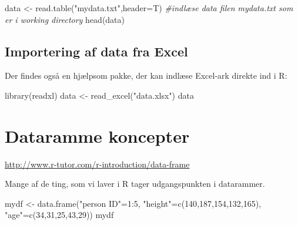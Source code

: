 \documentclass[
]{book}
\newenvironment{Shaded}{\begin{snugshade}}{\end{snugshade}}
\newcommand{\AttributeTok}[1]{\textcolor[rgb]{0.77,0.63,0.00}{#1}}
\newcommand{\CommentTok}[1]{\textcolor[rgb]{0.56,0.35,0.01}{\textit{#1}}}
\newcommand{\DecValTok}[1]{\textcolor[rgb]{0.00,0.00,0.81}{#1}}
\newcommand{\FunctionTok}[1]{\textcolor[rgb]{0.00,0.00,0.00}{#1}}
\newcommand{\NormalTok}[1]{#1}
\newcommand{\OtherTok}[1]{\textcolor[rgb]{0.56,0.35,0.01}{#1}}
\newcommand{\SpecialCharTok}[1]{\textcolor[rgb]{0.00,0.00,0.00}{#1}}
\newcommand{\StringTok}[1]{\textcolor[rgb]{0.31,0.60,0.02}{#1}}
\begin{document}
\begin{Shaded}
\begin{Highlighting}[]
\NormalTok{data }\OtherTok{\textless{}{-}} \FunctionTok{read.table}\NormalTok{(}\StringTok{"mydata.txt"}\NormalTok{,}\AttributeTok{header=}\NormalTok{T) }\CommentTok{\#indlæse data filen mydata.txt som er i working directory}
\FunctionTok{head}\NormalTok{(data)}
\end{Highlighting}
\end{Shaded}

\hypertarget{importering-af-data-fra-excel}{%
\subsection{Importering af data fra Excel}\label{importering-af-data-fra-excel}}

Der findes også en hjælpsom pakke, der kan indlæse Excel-ark direkte ind i R:

\begin{Shaded}
\begin{Highlighting}[]
\FunctionTok{library}\NormalTok{(readxl)}
\NormalTok{data }\OtherTok{\textless{}{-}} \FunctionTok{read\_excel}\NormalTok{(}\StringTok{"data.xlsx"}\NormalTok{)}
\NormalTok{data}
\end{Highlighting}
\end{Shaded}

\hypertarget{dataramme-koncepter}{%
\section{Dataramme koncepter}\label{dataramme-koncepter}}

\url{http://www.r-tutor.com/r-introduction/data-frame}

Mange af de ting, som vi laver i R tager udgangspunkten i datarammer.

\begin{Shaded}
\begin{Highlighting}[]
\NormalTok{mydf }\OtherTok{\textless{}{-}} \FunctionTok{data.frame}\NormalTok{(}\StringTok{"person ID"}\OtherTok{=}\DecValTok{1}\SpecialCharTok{:}\DecValTok{5}\NormalTok{, }\StringTok{"height"}\OtherTok{=}\FunctionTok{c}\NormalTok{(}\DecValTok{140}\NormalTok{,}\DecValTok{187}\NormalTok{,}\DecValTok{154}\NormalTok{,}\DecValTok{132}\NormalTok{,}\DecValTok{165}\NormalTok{), }\StringTok{"age"}\OtherTok{=}\FunctionTok{c}\NormalTok{(}\DecValTok{34}\NormalTok{,}\DecValTok{31}\NormalTok{,}\DecValTok{25}\NormalTok{,}\DecValTok{43}\NormalTok{,}\DecValTok{29}\NormalTok{))}
\NormalTok{mydf}
\end{Highlighting}
\end{Shaded}
\end{document}
